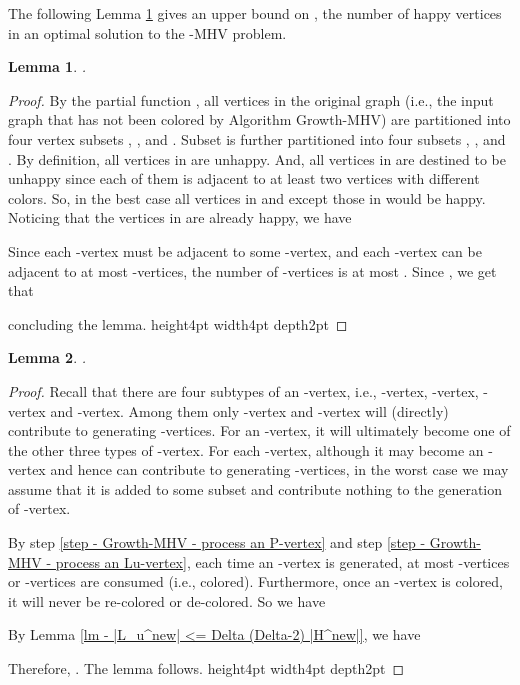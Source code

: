 \documentclass[11pt]{article}
\newtheorem{lemma}{Lemma}[section]
\newcommand{\qed}{\vrule height4pt width4pt depth2pt}
\begin{document}
The following Lemma \ref{lm - upper bound on OPT} gives an upper bound
on , the number of happy vertices in an optimal solution to
the -MHV problem.

\begin{lemma}
\label{lm - upper bound on OPT}
.
\end{lemma}
\begin{proof}
By the partial function , all vertices in the original graph
(i.e., the input graph that has not been colored by Algorithm {\sc Growth-MHV})
are partitioned into four vertex subsets , , 
and . Subset  is further partitioned into four subsets
, ,  and .
By definition, all vertices in  are unhappy.
And, all vertices in  are destined to be unhappy
since each of them is adjacent to at least two vertices with different
colors. So, in the best case all vertices in  and 
except those in  would be happy.
Noticing that the vertices in  are already happy, we have


Since each -vertex must be adjacent to some -vertex, and each
-vertex can be adjacent to at most  -vertices, the number
of -vertices is at most .
Since , we get that

concluding the lemma.
\qed
\end{proof}


\begin{lemma}
\label{lm - lower bound on |H^new|}
.
\end{lemma}
\begin{proof}
Recall that there are four subtypes of an -vertex, i.e., -vertex,
-vertex, -vertex and -vertex.
Among them only -vertex and -vertex will (directly) contribute
to generating -vertices.
For an -vertex, it will ultimately become one of the other three
types of -vertex.
For each -vertex, although it may become an -vertex and hence
can contribute to generating -vertices, in the worst case we may
assume that it is added to some subset 
and contribute nothing to the generation of -vertex.

By step \ref{step - Growth-MHV - process an P-vertex} and
step \ref{step - Growth-MHV - process an Lu-vertex},
each time an -vertex is generated, at most  -vertices or
-vertices are consumed (i.e., colored). Furthermore, once
an -vertex is colored, it will never be re-colored or de-colored.
So we have


By Lemma \ref{lm - |L_u^new| <= Delta (Delta-2) |H^new|},
we have

Therefore, .
The lemma follows.
\qed
\end{proof}
\end{document}
